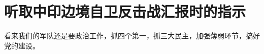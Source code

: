 \section[听取中印边境自卫反击战汇报时的指示（一九六三年二月）]{听取中印边境自卫反击战汇报时的指示}


看来我们的军队还是要政治工作，抓四个第一，抓三大民主，加强薄弱环节，搞好党的建设。


